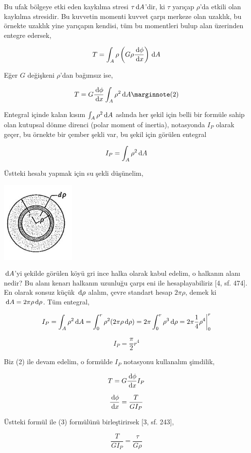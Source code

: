 \documentclass[12pt,fleqn]{article}\usepackage{../../common}
\begin{document}
Bu ufak bölgeye etki eden kaykılma stresi $\tau \,\mathrm{d} A$'dir, ki $\tau$ yarıçap
$\rho$'da etkili olan kaykılma stresidir. Bu kuvvetin momenti kuvvet çarpı
merkeze olan uzaklık, bu örnekte uzaklık yine yarıçapın kendisi, tüm bu
momentleri bulup alan üzerinden entegre edersek,

$$
T = \int_A \rho \left( G \rho \frac{\,\mathrm{d} \phi}{\,\mathrm{d} x} \right) \,\mathrm{d} A
$$

Eğer $G$ değişkeni $\rho$'dan bağımsız ise, 

$$
T = G \frac{\ud \phi}{\ud x} \int_A \rho^2 \ud A
\mlabel{2}
$$

Entegral içinde kalan kısım $\int_A \rho^2 \,\mathrm{d} A$ aslında her şekil için belli
bir formüle sahip olan kutupsal dönme direnci (polar moment of inertia),
notasyonda $I_P$ olarak geçer, bu örnekte bir çember şekli var, bu şekil için
görülen entegral

$$
I_P = \int_A \rho^2 \,\mathrm{d} A
$$

Üstteki hesabı yapmak için su şekli düşünelim, 

\includegraphics[width=10em]{phy_020_strs_06_05.jpg}

$\,\mathrm{d} A$'yi şekilde görülen köyü gri ince halka olarak kabul edelim, o halkanın
alanı nedir? Bu alanı kenarı halkanın uzunluğu çarpı eni ile hesaplayabiliriz
[4, sf. 474]. En olarak sonsuz küçük $\,\mathrm{d} \rho$ alalım, çevre standart hesap
$2\pi\rho$, demek ki $\,\mathrm{d} A = 2\pi\rho \,\mathrm{d} \rho$. Tüm entegral,

$$
I_P = \int_A \rho^2 \,\mathrm{d} A =
\int_{0}^{r} \rho^2 (2\pi\rho \,\mathrm{d} \rho) =
2\pi \int_{0}^{r} \rho^3 \,\mathrm{d} \rho =
2\pi \frac{1}{4} \rho^4 \bigg\vert_{0}^{r}
$$

$$
I_P = \frac{\pi}{2} r^4
$$

Biz (2) ile devam edelim, o formülde $I_P$ notasyonu kullanalım şimdilik,

$$
T = G \frac{\,\mathrm{d} \phi}{\,\mathrm{d} x} I_P
$$

$$
\frac{\,\mathrm{d} \phi}{\,\mathrm{d} x} = \frac{T}{G I_P}
$$

Üstteki formül ile (3) formülünü birleştirirsek [3, sf. 243],

$$
\frac{T}{G I_P} = \frac{\tau}{G \rho }
$$
\end{document}
